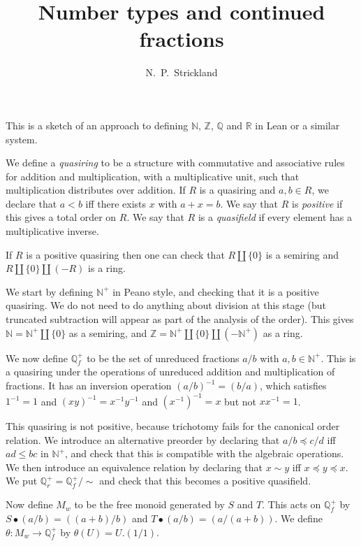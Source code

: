 \documentclass{amsart}
\newcommand{\N}         {{\mathbb{N}}}
\newcommand{\Q}         {{\mathbb{Q}}}
\newcommand{\R}         {{\mathbb{R}}}
\newcommand{\Z}         {{\mathbb{Z}}}
\newcommand{\tht}       {\theta}
\newcommand{\bu}	{\bullet}
\renewcommand{\:}{\colon}
\theoremstyle{definition}
\begin{document}
\title{Number types and continued fractions}
\author{N.~P.~Strickland}

\maketitle 

This is a sketch of an approach to defining $\N$, $\Z$, $\Q$ and $\R$
in Lean or a similar system.

We define a \emph{quasiring} to be a structure with commutative and
associative rules for addition and multiplication, with a
multiplicative unit, such that multiplication distributes over
addition.  If $R$ is a quasiring and $a,b\in R$, we declare that $a<b$
iff there exists $x$ with $a+x=b$.  We say that $R$ is \emph{positive}
if this gives a total order on $R$.  We say that $R$ is a
\emph{quasifield} if every element has a multiplicative inverse.

If $R$ is a positive quasiring then one can check that $R\amalg\{0\}$
is a semiring and $R\amalg\{0\}\amalg(-R)$ is a ring.

We start by defining $\N^+$ in Peano style, and checking that it is a
positive quasiring.  We do not need to do anything about division at
this stage (but truncated subtraction will appear as part of the
analysis of the order).  This gives $\N=\N^+\amalg\{0\}$ as a
semiring, and $\Z=\N^+\amalg\{0\}\amalg(-\N^+)$ as a ring.

We now define $\Q^+_f$ to be the set of unreduced fractions $a/b$ with
$a,b\in\N^+$.  This is a quasiring under the operations of unreduced
addition and multiplication of fractions.  It has an inversion
operation $(a/b)^{-1}=(b/a)$, which satisfies $1^{-1}=1$ and
$(xy)^{-1}=x^{-1}y^{-1}$ and $(x^{-1})^{-1}=x$ but not $xx^{-1}=1$.

This quasiring is not positive, because trichotomy fails for the
canonical order relation.  We introduce an alternative preorder by
declaring that $a/b\preceq c/d$ iff $ad\leq bc$ in $\N^+$, and check
that this is compatible with the algebraic operations.  We then
introduce an equivalence relation by declaring that $x\sim y$ iff
$x\preceq y\preceq x$.  We put $\Q^+_r=\Q^+_f/\sim$ and check that
this becomes a positive quasifield.

Now define $M_w$ to be the free monoid generated by $S$ and $T$.  This
acts on $\Q^+_f$ by $S\bu(a/b)=((a+b)/b)$ and $T\bu(a/b)=(a/(a+b))$.
We define $\tht\:M_w\to\Q^+_f$ by $\tht(U)=U.(1/1)$.
\end{document}
